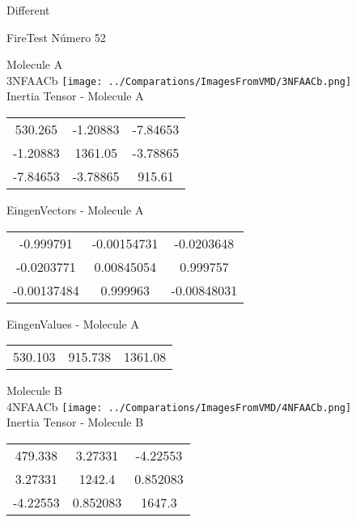 \begin{center}
\vtab
\vtab
\textcolor{NavyBlue}{\Large Different}
\end{center}

 \newpage

\vtab[-2cm]
\begin{center}
{\large FireTest \tab Número 52}
\end{center}
\begin{multicols}{2}
\begin{center}

Molecule A \\ 
3NFAACb
\texttt{[image: ../Comparations/ImagesFromVMD/3NFAACb.png]}
\\
Inertia Tensor - Molecule A \\
\vtab

\begin{tabular}{|c c c|}
530.265	 & 	-1.20883	 & 	-7.84653	 \\
-1.20883	 & 	1361.05	 & 	-3.78865	 \\
-7.84653	 & 	-3.78865	 & 	915.61
\end{tabular}

\vtab
 EingenVectors - Molecule A     \\
\vtab
\begin{tabular}{|c c c|}
-0.999791	 & 	-0.00154731	 & 	-0.0203648	 \\
-0.0203771	 & 	0.00845054	 & 	0.999757	 \\
-0.00137484	 & 	0.999963	 & 	-0.00848031
\end{tabular}

\vtab
 EingenValues - Molecule A     \\
\vtab
\begin{tabular}{|c c c|}
530.103	 & 	915.738	 & 	1361.08	 \\
\end{tabular}
\columnbreak

Molecule B \\ 
4NFAACb
\texttt{[image: ../Comparations/ImagesFromVMD/4NFAACb.png]}
\\
Inertia Tensor - Molecule B \\
\vtab

\begin{tabular}{|c c c|}
479.338	 & 	3.27331	 & 	-4.22553	 \\
3.27331	 & 	1242.4	 & 	0.852083	 \\
-4.22553	 & 	0.852083	 & 	1647.3
\end{tabular}


\end{center}
\end{multicols}

